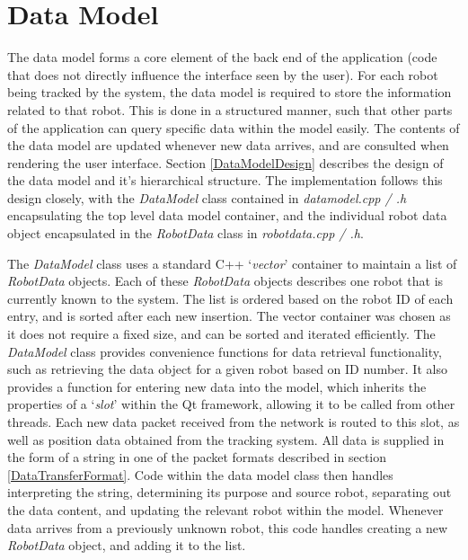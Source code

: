 
\section{Data Model} \label{DataModel}
The data model forms a core element of the back end of the application (code that does not directly influence the interface seen by the user). For each robot being tracked by the system, the data model is required to store the information related to that robot. This is done in a structured manner, such that other parts of the application can query specific data within the model easily. The contents of the data model are updated whenever new data arrives, and are consulted when rendering the user interface. Section \ref{DataModelDesign} describes the design of the data model and it's hierarchical structure. The implementation follows this design closely, with the \textit{DataModel} class contained in \textit{datamodel.cpp / .h} encapsulating the top level data model container, and the individual robot data object encapsulated in the \textit{RobotData} class in \textit{robotdata.cpp / .h}.

The \textit{DataModel} class uses a standard C++ `\textit{vector}' container to maintain a list of \textit{RobotData} objects. Each of these \textit{RobotData} objects describes one robot that is currently known to the system. The list is ordered based on the robot ID of each entry, and is sorted after each new insertion. The vector container was chosen as it does not require a fixed size, and can be sorted and iterated efficiently. The \textit{DataModel} class provides convenience functions for data retrieval functionality, such as retrieving the data object for a given robot based on ID number. It also provides a function for entering new data into the model, which inherits the properties of a `\textit{slot}' within the Qt framework, allowing it to be called from other threads. Each new data packet received from the network is routed to this slot, as well as position data obtained from the tracking system. All data is supplied in the form of a string in one of the packet formats described in section \ref{DataTransferFormat}. Code within the data model class then handles interpreting the string, determining its purpose and source robot, separating out the data content, and updating the relevant robot within the model. Whenever data arrives from a previously unknown robot, this code handles creating a new \textit{RobotData} object, and adding it to the list.

